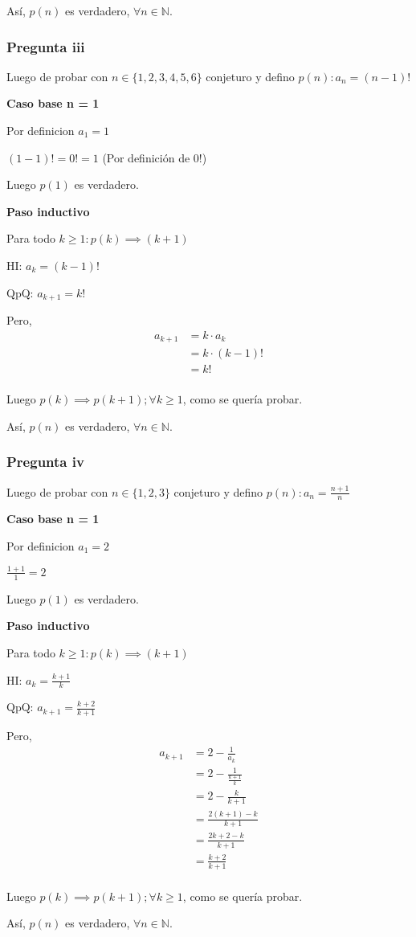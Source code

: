 Así, $p(n)$ es verdadero, $\forall n \in \mathbb{N}$.

\subsubsection{Pregunta iii}

Luego de probar con $ n \in \{ 1,2,3,4,5,6 \} $ conjeturo y defino $ p(n): a_n = (n-1)! $

\textbf{Caso base n = 1}

Por definicion $ a_1 = 1$

$ (1-1)! = 0! = 1$ (Por definición de 0!)

Luego $ p(1) $ es verdadero.

\textbf{Paso inductivo}

Para todo $k \geq 1: p(k) \implies (k+1)$

HI: $ a_k = (k-1)!$

QpQ: $ a_{k+1} = k!$

Pero,
\begin{align*}
    a_{k+1} &= k\cdot a_k \\
    &= k\cdot (k-1)! \\
    &= k! \\
\end{align*}

Luego $p(k) \implies p(k+1); \forall k \geq 1$, como se quería probar.

Así, $p(n)$ es verdadero, $\forall n \in \mathbb{N}$.

\subsubsection{Pregunta iv}

Luego de probar con $ n \in \{ 1,2,3 \} $ conjeturo y defino $ p(n): a_n = \frac{n+1}{n} $

\textbf{Caso base n = 1}

Por definicion $ a_1 = 2$

$ \frac{1+1}{1} = 2 $

Luego $ p(1) $ es verdadero.

\textbf{Paso inductivo}

Para todo $k \geq 1: p(k) \implies (k+1)$

HI: $ a_k = \frac{k+1}{k}$

QpQ: $ a_{k+1} = \frac{k+2}{k+1}$

Pero,
\begin{align*}
    a_{k+1} &= 2-\frac{1}{a_k} \\ 
    &= 2-\frac{1}{\frac{k+1}{k}} \\ 
    &= 2-\frac{k}{k+1} \\
    &= \frac{2(k+1)-k}{k+1} \\
    &= \frac{2k+2-k}{k+1} \\
    &= \frac{k+2}{k+1} \\
\end{align*}

Luego $p(k) \implies p(k+1); \forall k \geq 1$, como se quería probar.

Así, $p(n)$ es verdadero, $\forall n \in \mathbb{N}$.


